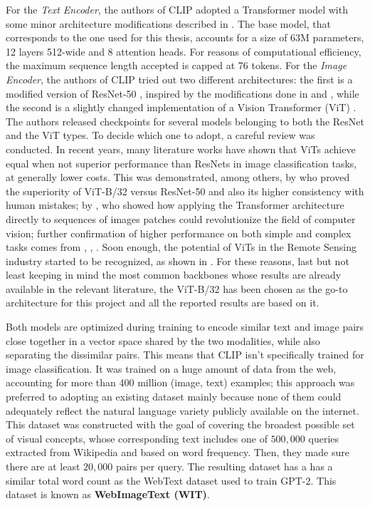 \documentclass[a4paper, oneside, english]{sapthesis}
\begin{document}
For the \emph{Text Encoder}, the authors of CLIP adopted a Transformer model \cite{vaswani2017attention} with some minor architecture modifications described in \cite{radford2019language}. The base model, that corresponds to the one used for this thesis, accounts for a size of 63M parameters, 12 layers 512-wide and 8 attention heads. For reasons of computational efficiency, the maximum sequence length accepted is capped at 76 tokens.
For the \emph{Image Encoder}, the authors of CLIP tried out two different architectures: the first is a modified version of ResNet-50 \cite{he2016deep}, inspired by the modifications done in \cite{he2019bag} and \cite{zhang2019making}, while the second is a slightly changed implementation of a Vision Transformer (ViT) \cite{dosovitskiy2020image}. The authors released checkpoints for several models belonging to both the ResNet and the ViT types. To decide which one to adopt, a careful review was conducted. In recent years, many literature works have shown  that ViTs achieve equal when not superior performance than ResNets in image classification tasks, at generally lower costs. This was demonstrated, among others, by \cite{tuli2021convolutional} who proved the superiority of ViT-B/32 versus ResNet-50 and also its higher consistency with human mistakes; by \cite{dosovitskiy2020image}, who showed how applying the Transformer architecture directly to sequences of images patches could revolutionize the field of computer vision; further confirmation of higher performance on both simple and complex tasks comes from \cite{deininger2022comparative}, \cite{hutten2022vision}, \cite{liu2024multivariate}. Soon enough, the potential of ViTs in the Remote Sensing industry started to be recognized, as shown in \cite{wang2022hyperspectral}. For these reasons, last but not least keeping in mind the most common backbones whose results are already available in the relevant literature, the ViT-B/32 has been chosen as the go-to architecture for this project and all the reported results are based on it.  

Both models are optimized during training to encode similar text and image pairs close together in a vector space shared by the two modalities, while also separating the dissimilar pairs. This means that CLIP isn't specifically trained for image classification. It was trained on a huge amount of data from the web, accounting for more than 400 million (image, text) examples; this approach was preferred to adopting an existing dataset mainly because none of them could adequately reflect the natural language variety publicly available on the internet. This dataset was constructed with the goal of covering the broadest possible set of visual concepts, whose corresponding text includes one of $500,000$ queries extracted from Wikipedia and based on word frequency. Then, they made sure there are at least $20,000$ pairs per query. The resulting dataset has a has a similar total word count as the WebText dataset used to train GPT-2. This dataset is known as \textbf{WebImageText (WIT)}.
\end{document}
